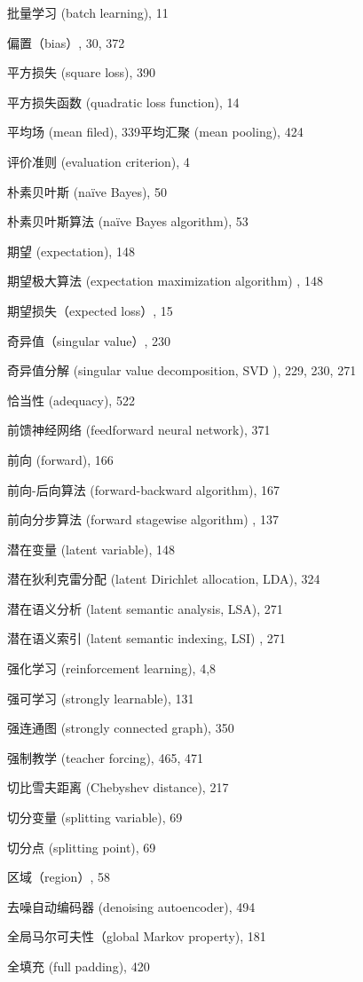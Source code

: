 \documentclass[10pt]{article}
\begin{document}
批量学习 (batch learning), 11

偏置（bias）, 30, 372

平方损失 (square loss), 390

平方损失函数 (quadratic loss function), 14

平均场 (mean filed), 339平均汇聚 (mean pooling), 424

评价准则 (evaluation criterion), 4

朴素贝叶斯 (naïve Bayes), 50

朴素贝叶斯算法 (naïve Bayes algorithm), 53

期望 (expectation), 148

期望极大算法 (expectation maximization algorithm) , 148

期望损失（expected loss）, 15

奇异值（singular value）, 230

奇异值分解 (singular value decomposition, SVD ), 229, 230, 271

恰当性 (adequacy), 522

前馈神经网络 (feedforward neural network), 371

前向 (forward), 166

前向-后向算法 (forward-backward algorithm), 167

前向分步算法 (forward stagewise algorithm) , 137

潜在变量 (latent variable), 148

潜在狄利克雷分配 (latent Dirichlet allocation, LDA), 324

潜在语义分析 (latent semantic analysis, LSA), 271

潜在语义索引 (latent semantic indexing, LSI) , 271

强化学习 (reinforcement learning), 4,8

强可学习 (strongly learnable), 131

强连通图 (strongly connected graph), 350

强制教学 (teacher forcing), 465, 471

切比雪夫距离 (Chebyshev distance), 217

切分变量 (splitting variable), 69

切分点 (splitting point), 69

区域（region）, 58

去噪自动编码器 (denoising autoencoder), 494

全局马尔可夫性（global Markov property), 181

全填充 (full padding), 420
\end{document}
